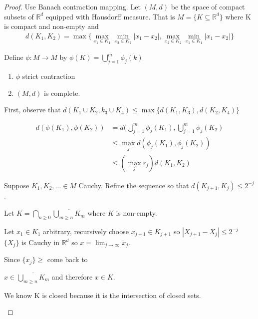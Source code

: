 \begin{proof}
	Use Banach contraction mapping. Let $(M,d)$ be the space of compact subsets of $\mathbb{R}^d$ equipped with Hausdorff measure.
	That is $M = \{K \subseteq \mathbb{R}^d\}$ where K is compact and non-empty
	and
	\begin{align*}
		d(K_1, K_2) = \max\{ \max_{x_1 \in K_1} \min_{x_2 \in K_2} |x_1 - x_2|, \max_{x_2 \in K_2} \min_{x_1 \in K_1} |x_1 - x_2| \}
	\end{align*}

	Define $\phi : M \to M$ by  $\phi (K) = \bigcup_{j=1}^{m} \phi_j (k)$
	\begin{claim}
		\begin{enumerate}
			\item $\phi$ strict contraction
			\item $(M,d)$ is complete.
		\end{enumerate}
	\end{claim}

	First, observe that $d(K_1 \cup K_2, k_3 \cup K_4) \leq \max\{d(K_1, K_3), d(K_2, K_4)\}$

	\begin{subproof}
		\begin{align*}
			d(\phi(K_1), \phi (K_2)) &= d( \bigcup_{j=1}^{m} \phi_j(K_1),\bigcup_{j=1}^{m} \phi_j (K_2) \\
									 &\leq \max_{j} d( \phi_{j}(K_1), \phi_{j}(K_2)) \\
									 &\leq (\max_{j} r_{j}) d(K_{1}, K_2)
		\end{align*} 
	\end{subproof}
	
	\begin{subproof} 
	  
	Suppose $K_1, K_2, \ldots \in M$ Cauchy. Refine the sequence so that $d(K_{j+1}, K_j ) \leq 2^{-j}$.

		Let $K = \bigcap_{n \geq 0} \overline{\bigcup_{m \geq n} K_m}$ where $K$ is non-empty.

		Let $x_1 \in K_1$ arbitrary, recursively choose $x_{j+1} \in K_{j+1}$ so $|X_{j+1} - X_j | \leq 2^{-j}$
		$\{X_j\}$ is Cauchy in $\mathbb{R}^d$ so $x = \lim_{j \to \infty} x_j$.

		Since $\{x_j\} \geq$ come back to

		$x \in \overline{\bigcup_{m \geq n} K_{m}}$ and therefore $x \in K$.
		
		We know K is closed because it is the intersection of closed sets.
		

\end{subproof}
\end{proof}
